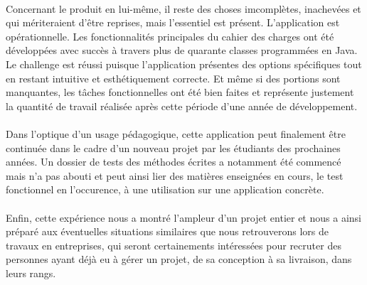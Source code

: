 \documentclass[a4paper,10pt]{report}
\begin{document}
    \paragraph{}
      Concernant le produit en lui-même, il reste des choses imcomplètes, inachevées et qui mériteraient d'être reprises, mais l'essentiel est présent.
      L'application est opérationnelle. Les fonctionnalités principales du cahier des charges ont été développées avec succès à travers plus de quarante classes programmées en Java.
      Le challenge est réussi puisque l'application présentes des options spécifiques tout en restant intuitive et esthétiquement correcte.
      Et même si des portions sont manquantes, les tâches fonctionnelles ont été bien faites et représente justement la quantité de travail réalisée après cette période d'une année de développement.
      
    \paragraph{}
      Dans l'optique d'un usage pédagogique, cette application peut finalement être continuée dans le cadre d'un nouveau projet par les étudiants des prochaines années.
      Un dossier de tests des méthodes écrites a notamment été commencé mais n'a pas abouti et peut ainsi lier des matières enseignées en cours, le test fonctionnel en l'occurence, à une utilisation sur une application concrète.
      
      
    \paragraph{}
      Enfin, cette expérience nous a montré l'ampleur d'un projet entier et nous a ainsi préparé aux éventuelles situations similaires que nous retrouverons lors de travaux en entreprises, qui seront certainements intéressées pour recruter des personnes ayant déjà eu à gérer un projet, de sa conception à sa livraison, dans leurs rangs.
    
\end{document}
